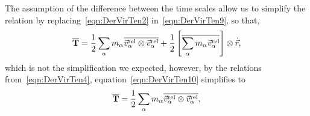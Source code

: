 \documentclass[../../main-notes.tex]{subfiles}
\begin{document}
The assumption of the difference between the time scales allow us to simplify the relation by replacing~\eqref{eqn:DerVirTen2} in~\eqref{eqn:DerVirTen9}, so that,
\begin{equation}
    \overline{\bold{T}}=
        \frac{1}{2}\sum_\alpha m_\alpha\overline{\vec{v}_\alpha^{\mathrm{rel}}\otimes\vec{v}_\alpha^{\mathrm{rel}}}
        +
        \frac{1}{2} \left[\overline{\sum_\alpha m_\alpha\vec{v}_\alpha^{\mathrm{rel}}}\right]\otimes\dot{\vec{r}}\label{eqn:DerVirTen10},
\end{equation}
which is not the simplification we expected, however, by the relations from~\eqref{eqn:DerVirTen4}, equation~\eqref{eqn:DerVirTen10} simplifies to
\begin{equation}
    \overline{\bold{T}}=
        \frac{1}{2}\sum_\alpha m_\alpha\overline{\vec{v}_\alpha^{\mathrm{rel}}\otimes\vec{v}_\alpha^{\mathrm{rel}}}\label{eqn:DerVirTen11},
\end{equation}
\end{document}

